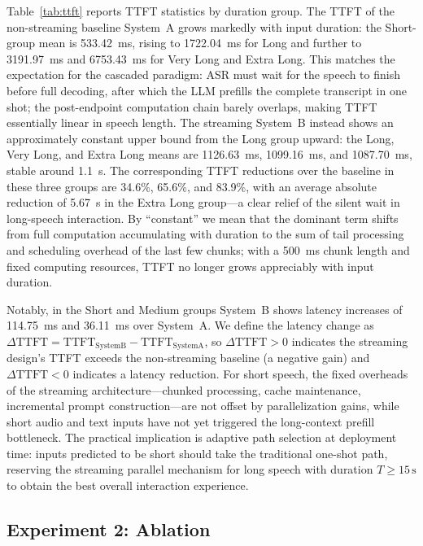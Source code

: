 \documentclass[a4paper,11pt]{article}
\begin{document}
Table~\ref{tab:ttft} reports TTFT statistics by duration group. The TTFT of the non-streaming baseline System~A grows markedly with input duration: the Short-group mean is 533.42~ms, rising to 1722.04~ms for Long and further to 3191.97~ms and 6753.43~ms for Very Long and Extra Long. This matches the expectation for the cascaded paradigm: ASR must wait for the speech to finish before full decoding, after which the LLM prefills the complete transcript in one shot; the post-endpoint computation chain barely overlaps, making TTFT essentially linear in speech length. The streaming System~B instead shows an approximately constant upper bound from the Long group upward: the Long, Very Long, and Extra Long means are 1126.63~ms, 1099.16~ms, and 1087.70~ms, stable around 1.1~s. The corresponding TTFT reductions over the baseline in these three groups are 34.6\%, 65.6\%, and 83.9\%, with an average absolute reduction of 5.67~s in the Extra Long group---a clear relief of the silent wait in long-speech interaction. By ``constant'' we mean that the dominant term shifts from full computation accumulating with duration to the sum of tail processing and scheduling overhead of the last few chunks; with a 500~ms chunk length and fixed computing resources, TTFT no longer grows appreciably with input duration.

Notably, in the Short and Medium groups System~B shows latency increases of 114.75~ms and 36.11~ms over System~A. We define the latency change as $\Delta \mathrm{TTFT}=\mathrm{TTFT}_{\mathrm{SystemB}}-\mathrm{TTFT}_{\mathrm{SystemA}}$, so $\Delta \mathrm{TTFT}>0$ indicates the streaming design's TTFT exceeds the non-streaming baseline (a negative gain) and $\Delta \mathrm{TTFT}<0$ indicates a latency reduction. For short speech, the fixed overheads of the streaming architecture---chunked processing, cache maintenance, incremental prompt construction---are not offset by parallelization gains, while short audio and text inputs have not yet triggered the long-context prefill bottleneck. The practical implication is adaptive path selection at deployment time: inputs predicted to be short should take the traditional one-shot path, reserving the streaming parallel mechanism for long speech with duration $T\geq 15\,\mathrm{s}$ to obtain the best overall interaction experience.

\subsection{Experiment 2: Ablation}
\end{document}
